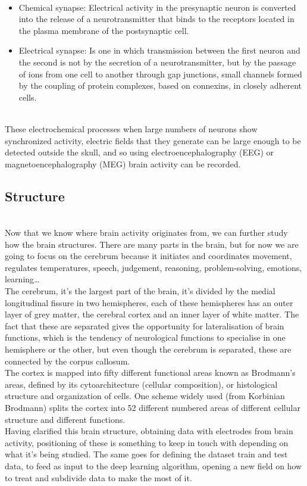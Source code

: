 \\
\begin{itemize}
  \item	Chemical synapse: Electrical activity in the presynaptic neuron is converted into the release of a neurotransmitter that binds to the receptors located in the plasma membrane of the postsynaptic cell.
  \item	Electrical synapse: Is one in which transmission between the first neuron and the second is not by the secretion of a neurotransmitter, but by the passage of ions from one cell to another through gap junctions, small channels formed by the coupling of protein complexes, based on connexins, in closely adherent cells.
\end{itemize}

\leavevmode\\
These electrochemical processes when large numbers of neurons show synchronized activity, electric fields that they generate can be large enough to be detected outside the skull, and so using electroencephalography (EEG) or magnetoencephalography (MEG) brain activity can be recorded.
\\

\subsection{Structure}
\label{subsec-structure}
\leavevmode\\
Now that we know where brain activity originates from, we can further study how the brain structures. There are many parts in the brain, but for now we are going to focus on the cerebrum because it initiates and coordinates movement, regulates temperatures, speech, judgement, reasoning, problem-solving, emotions, learning…
\\
The cerebrum\cite{Cerebrum}, it’s the largest part of the brain, it’s divided by the medial longitudinal fissure in two hemispheres, each of these hemispheres has an outer layer of grey matter, the cerebral cortex and an inner layer of white matter. The fact that these are separated gives the opportunity for lateralisation of brain functions, which is the tendency of neurological functions to specialise in one hemisphere or the other, but even though the cerebrum\cite{Cerebrum} is separated, these are connected by the corpus callosum.
\\
The cortex is mapped into fifty different functional areas known as Brodmann’s areas\cite{Brodmannarea}, defined by its cytoarchitecture (cellular composition), or histological structure and organization of cells. One scheme widely used (from Korbinian Brodmann)\cite{Brodmannarea} splits the cortex into 52 different numbered areas of different cellular structure and different functions.
\\
Having clarified this brain structure, obtaining data with electrodes from brain activity, positioning of these is something to keep in touch with depending on what it’s being studied. The same goes for defining the dataset train and test data, to feed as input to the deep learning algorithm, opening a new field on how to treat and subdivide data to make the most of it.
\\